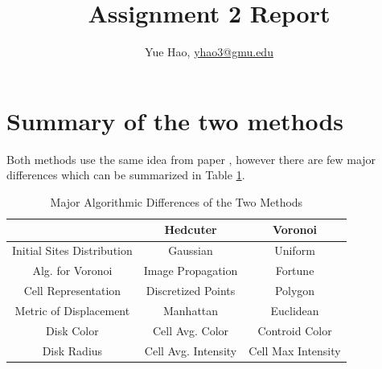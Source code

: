 \documentclass[11pt]{article}
\title{Assignment 2 Report}
\author{ Yue Hao, \url{yhao3@gmu.edu}}
\date{}
\begin{document}
\maketitle

\section{Summary of the two methods}

Both methods use the same idea from paper \cite{secord}, however there are few major differences which can be summarized in Table \ref{tb:diff}.
\begin{table}[H]
\centering
\caption{Major Algorithmic Differences of the Two Methods}
\label{tb:diff}
\begin{tabular}{|c|c|c|}
\hline 
 & Hedcuter & Voronoi \\ 
\hline 
Initial Sites Distribution & Gaussian & Uniform \\ 
\hline 
Alg. for Voronoi & Image Propagation& Fortune\\ 
 \hline 
Cell Representation & Discretized Points & Polygon \\ 
\hline 
Metric of Displacement & Manhattan & Euclidean \\ 
\hline 
Disk Color & Cell Avg. Color & Controid Color \\ 
\hline 
Disk Radius & Cell Avg. Intensity & Cell Max Intensity\\ 
\hline
\end{tabular} 
\end{table}
\end{document}
